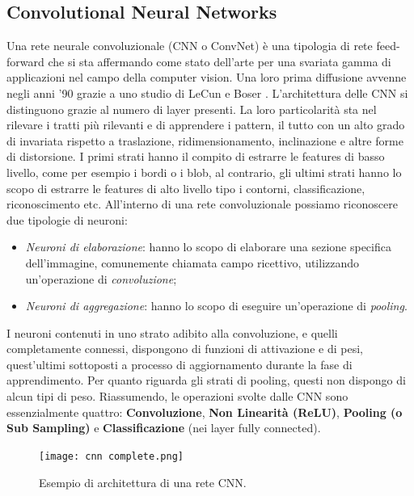 \subsection{Convolutional Neural Networks}\label{RNC}
Una rete neurale convoluzionale (CNN o ConvNet) è una tipologia di rete 
feed-forward che si sta affermando come stato dell'arte per una svariata 
gamma di applicazioni nel campo della computer vision. Una loro prima 
diffusione avvenne negli anni '90 grazie a uno studio di LeCun e Boser \cite{NIPS1989_53c3bce6}. 
L'architettura delle CNN si distinguono grazie al numero di layer presenti.  
La loro particolarità sta nel rilevare i tratti più rilevanti e di apprendere 
i pattern, il tutto con un alto grado di invariata rispetto a traslazione, 
ridimensionamento, inclinazione e altre forme di distorsione. I primi strati 
hanno il compito di estrarre le features di basso livello, come per esempio i 
bordi o i blob, al contrario, gli ultimi strati hanno lo scopo di estrarre le 
features di alto livello tipo i contorni, classificazione, riconoscimento etc. 
All'interno di una rete convoluzionale possiamo riconoscere due tipologie di 
neuroni:
\begin{itemize}
    \item \emph{Neuroni di elaborazione}: hanno lo scopo di elaborare una sezione 
    specifica dell'immagine, comunemente chiamata campo ricettivo, 
    utilizzando un'operazione di \emph{convoluzione};
    \item \emph{Neuroni di aggregazione}: hanno lo scopo di eseguire un'operazione di 
    \emph{pooling}.
\end{itemize}
I neuroni contenuti in uno strato adibito alla convoluzione, e quelli completamente 
connessi, dispongono di funzioni di attivazione e di pesi, quest'ultimi 
sottoposti a processo di aggiornamento durante la fase di apprendimento. 
Per quanto riguarda gli strati di pooling, questi non dispongo di alcun tipi 
di peso. Riassumendo, le operazioni svolte dalle CNN sono essenzialmente 
quattro: {\bfseries{Convoluzione}}, {\bfseries{Non Linearità (ReLU)}}, {\bfseries{Pooling (o Sub 
Sampling)}} e {\bfseries{Classificazione}} (nei layer fully connected). 
\begin{figure}
    \centering
    \texttt{[image: cnn complete.png]}
    \centering
    \caption{Esempio di architettura di una rete CNN.}
    \label{CNN complete}
\end{figure}

